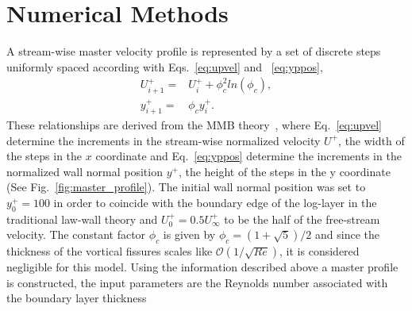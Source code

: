 \documentclass[aps,reprint,amsmath,amssymb,prl]{revtex4-1}%
\begin{document}
\maketitle
\section{Numerical Methods}
A stream-wise master velocity profile is represented by a set of discrete steps uniformly spaced according with Eqs.~\ref{eq:upvel} and ~\ref{eq:yppos}, 
\begin{align}
U^+_{i+1}=&U^+_i+\phi_c^2 ln(\phi_c) \label{eq:upvel},\\
y^+_{i+1}=&\phi_c y^+_i \label{eq:yppos}.
\end{align}
These relationships are  derived from the MMB theory~\citep{Klewickimmb}, where Eq.~\ref{eq:upvel} determine the increments in the stream-wise normalized velocity $U^+$, the width of the steps in the $x$ coordinate and
Eq.~\ref{eq:yppos} determine the increments in the normalized wall normal position $y^+$, the height of the steps in the y coordinate (See Fig.~\ref{fig:master_profile}). The initial wall normal position was set to $y^+_0=100$ in order to coincide with the boundary edge of the log-layer in the traditional law-wall theory and $U^+_0=0.5 U_{\infty}^+$ to be the half of the free-stream velocity. The constant factor $\phi_c$ is given by $\phi_c=(1+\sqrt{5})/2$ and since the thickness of the
vortical fissures scales like $\mathcal{O}(1/\sqrt{Re})$, it is considered negligible for this model.  Using the information described above a master profile is constructed, the input parameters are the Reynolds number associated with the boundary layer thickness
\end{document}

